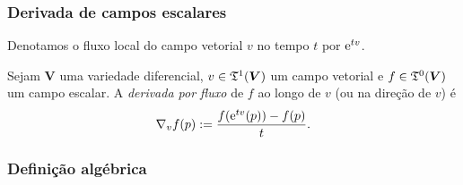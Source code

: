 \subsubsection{Derivada de campos escalares}

Denotamos o fluxo local do campo vetorial $v$ no tempo $t$ por $\mathrm{e}^{tv}$.

\begin{definition}
Sejam $\bm V$ uma variedade diferencial, $v \in \mathfrak{T}^1(\bm V)$ um campo vetorial e $f \in \mathfrak{T}^0(\bm V)$ um campo escalar. A \emph{derivada por fluxo} de $f$ ao longo de $v$ (ou na direção de $v$) é
	\begin{equation*}
	\nabla_v f(p) := \frac{f(\mathrm{e}^{tv}(p))-f(p)}{t}.
	\end{equation*}
\end{definition}





\subsubsection{Definição algébrica}

